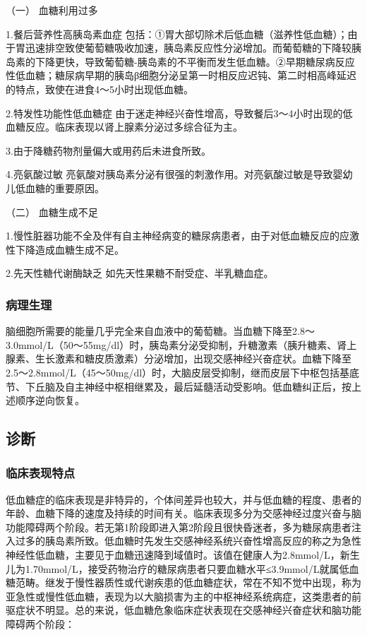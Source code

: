 \hypertarget{text00120.htmlux5cux23CHP4-13-1-2-1}{}
（一） 血糖利用过多

1.餐后营养性高胰岛素血症
包括：①胃大部切除术后低血糖（滋养性低血糖）；由于胃迅速排空致使葡萄糖吸收加速，胰岛素反应性分泌增加。而葡萄糖的下降较胰岛素的下降更快，导致葡萄糖-胰岛素的不平衡而发生低血糖。②早期糖尿病反应性低血糖；糖尿病早期的胰岛β细胞分泌呈第一时相反应迟钝、第二时相高峰延迟的特点，致使在进食4～5小时出现低血糖。

2.特发性功能性低血糖症
由于迷走神经兴奋性增高，导致餐后3～4小时出现的低血糖反应。临床表现以肾上腺素分泌过多综合征为主。

3.由于降糖药物剂量偏大或用药后未进食所致。

4.亮氨酸过敏
亮氨酸对胰岛素分泌有很强的刺激作用。对亮氨酸过敏是导致婴幼儿低血糖的重要原因。

\hypertarget{text00120.htmlux5cux23CHP4-13-1-2-2}{}
（二） 血糖生成不足

1.慢性脏器功能不全及伴有自主神经病变的糖尿病患者，由于对低血糖反应的应激性下降造成血糖生成不足。

2.先天性糖代谢酶缺乏 如先天性果糖不耐受症、半乳糖血症。

\subsubsection{病理生理}

脑细胞所需要的能量几乎完全来自血液中的葡萄糖。当血糖下降至2.8～3.0mmol/L（50～55mg/dl）时，胰岛素分泌受抑制，升糖激素（胰升糖素、肾上腺素、生长激素和糖皮质激素）分泌增加，出现交感神经兴奋症状。血糖下降至2.5～2.8mmol/L（45～50mg/dl）时，大脑皮层受抑制，继而皮层下中枢包括基底节、下丘脑及自主神经中枢相继累及，最后延髓活动受影响。低血糖纠正后，按上述顺序逆向恢复。

\subsection{诊断}

\subsubsection{临床表现特点}

低血糖症的临床表现是非特异的，个体间差异也较大，并与低血糖的程度、患者的年龄、血糖下降的速度及持续的时间有关。临床表现多分为交感神经过度兴奋与脑功能障碍两个阶段。若无第1阶段即进入第2阶段且很快昏迷者，多为糖尿病患者注入过多的胰岛素所致。低血糖时先发生交感神经系统兴奋性增高反应的称之为急性神经性低血糖，主要见于血糖迅速降到域值时。该值在健康人为2.8mmol/L，新生儿为1.70mmol/L，接受药物治疗的糖尿病患者只要血糖水平≤3.9mmol/L就属低血糖范畴。继发于慢性器质性或代谢疾患的低血糖症状，常在不知不觉中出现，称为亚急性或慢性低血糖，表现为以大脑损害为主的中枢神经系统病症，这类患者的前驱症状不明显。总的来说，低血糖危象临床症状表现在交感神经兴奋症状和脑功能障碍两个阶段：

